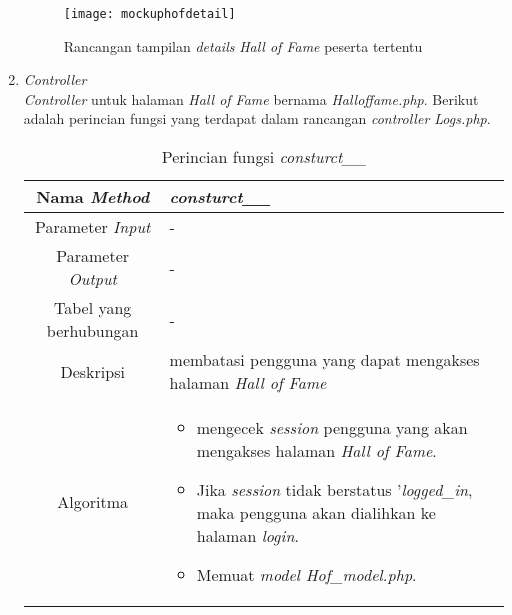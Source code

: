 \begin{enumerate}
	\begin{figure}[H]
		\centering  
		\texttt{[image: mockuphofdetail]}  
		\caption[Rancangan tampilan \textit{details} \textit{Hall of Fame} peserta tertentu]{Rancangan tampilan \textit{details} \textit{Hall of Fame} peserta tertentu} 
		\label{fig:mockuphofdetail} 
	\end{figure}
	
	\item \textit{Controller} \\
	\textit{Controller} untuk halaman \textit{Hall of Fame} bernama \textit{Halloffame.php}. Berikut adalah perincian fungsi yang terdapat dalam rancangan \textit{controller Logs.php}.
	\begin{table}[H]
		\caption{Perincian fungsi \textit{consturct\_\_}}
		\begin{tabular}{|c|p{11cm}|}
			\hline
			Nama \textit{Method} 	& 	\textit{consturct\_\_} 	\\
			\hline
			Parameter \textit{Input} & - \\
			\hline
			Parameter \textit{Output} &  - \\
			\hline
			Tabel yang berhubungan & - \\
			\hline
			Deskripsi	& membatasi pengguna yang dapat mengakses halaman \textit{Hall of Fame}	 \\
			\hline
			Algoritma	& \begin{itemize}
				\item mengecek \textit{session} pengguna yang akan mengakses halaman \textit{Hall of Fame}.
				\item Jika \textit{session} tidak berstatus '\textit{logged\_in}, maka pengguna akan dialihkan ke halaman \textit{login}.
				\item Memuat \textit{model Hof\_model.php}.
			\end{itemize} \\
			\hline
		\end{tabular}
	\end{table}
	

\end{enumerate}
